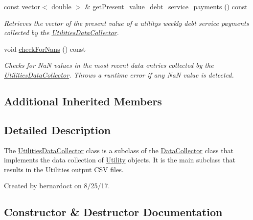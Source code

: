 \begin{DoxyCompactItemize}
const vector$<$ double $>$ \& \mbox{\hyperlink{classUtilitiesDataCollector_afdfabc1bf2b9b2f8639744afeaa76e11}{get\+Present\+\_\+value\+\_\+debt\+\_\+service\+\_\+payments}} () const
\begin{DoxyCompactList}\small\item\em Retrieves the vector of the present value of a utility\textquotesingle{}s weekly debt service payments collected by the {\ttfamily \mbox{\hyperlink{classUtilitiesDataCollector}{Utilities\+Data\+Collector}}}. \end{DoxyCompactList}\item 
void \mbox{\hyperlink{classUtilitiesDataCollector_af01392bbfae02a1fd9ee65b3c97a73a3}{check\+For\+Nans}} () const
\begin{DoxyCompactList}\small\item\em Checks for {\ttfamily NaN} values in the most recent data entries collected by the {\ttfamily \mbox{\hyperlink{classUtilitiesDataCollector}{Utilities\+Data\+Collector}}}. Throws a runtime error if any {\ttfamily NaN} value is detected. \end{DoxyCompactList}\end{DoxyCompactItemize}
\subsection*{Additional Inherited Members}


\subsection{Detailed Description}
The {\ttfamily \mbox{\hyperlink{classUtilitiesDataCollector}{Utilities\+Data\+Collector}}} class is a subclass of the {\ttfamily \mbox{\hyperlink{classDataCollector}{Data\+Collector}}} class that implements the data collection of \mbox{\hyperlink{classUtility}{Utility}} objects. It is the main subclass that results in the Utilities\textquotesingle{} output C\+SV files. 

Created by bernardoct on 8/25/17. 

\subsection{Constructor \& Destructor Documentation}
\mbox{\label{classUtilitiesDataCollector_a7aee55a1cbd0fcdca59339a9e78ed08b}} 
